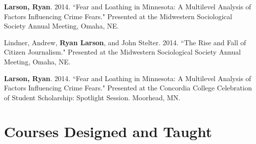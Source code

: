 \documentclass[letterpaper]{article}
\renewenvironment{itemize}{
  \begin{list}{}{
    \setlength{\leftmargin}{1.5em}
  }
}{
  \end{list}
}
\begin{document}
\begin{itemize}
\item \textbf{Larson, Ryan}. 2014. ``Fear and Loathing in Minnesota: A Multilevel Analysis of Factors Influencing Crime Fears." Presented at the Midwestern Sociological Society Annual Meeting, Omaha, NE.
\item Lindner, Andrew, \textbf{Ryan Larson}, and John Stelter. 2014. ``The Rise and Fall of Citizen Journalism." Presented at the Midwestern Sociological Society Annual Meeting, Omaha, NE. 
\item \textbf{Larson, Ryan}. 2014. ``Fear and Loathing in Minnesota: A Multilevel Analysis of Factors Influencing Crime Fears." Presented at the Concordia College Celebration of Student Scholarship: Spotlight Session. Moorhead, MN. 


\end{itemize}


\section*{\textbf{Courses Designed and Taught}}
\end{document}
